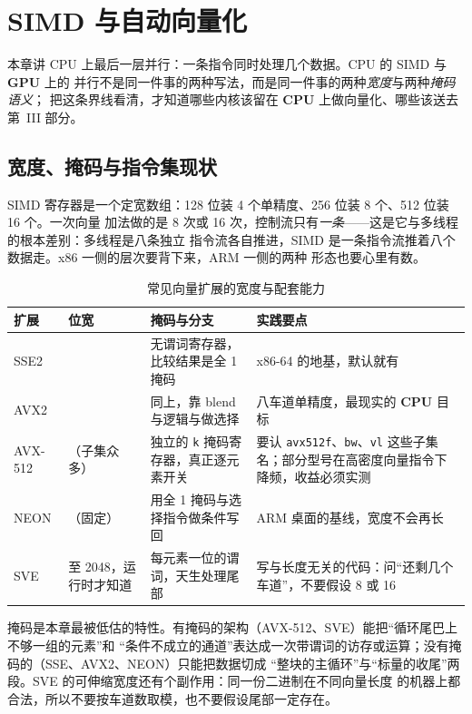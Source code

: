 \documentclass[12pt,a4paper,fontset=fandol]{ctexbook}
\newcommand{\Tp}[1]{\texttt{#1}}
\newcommand{\Dom}[1]{\textsf{\bfseries #1}}
\newcommand{\CPU}{\Dom{CPU}}
\newcommand{\GPU}{\Dom{GPU}}
\begin{document}
\chapter{SIMD 与自动向量化}

本章讲 CPU 上最后一层并行：一条指令同时处理几个数据。CPU 的 SIMD 与 \GPU{} 上的
并行不是同一件事的两种写法，而是同一件事的两种\emph{宽度}与两种\emph{掩码语义}；
把这条界线看清，才知道哪些内核该留在 \CPU{} 上做向量化、哪些该送去第~III 部分。

\section{宽度、掩码与指令集现状}

SIMD 寄存器是一个定宽数组：128 位装 4 个单精度、256 位装 8 个、512 位装 16 个。一次向量
加法做的是 8 次或 16 次，控制流只有\emph{一条}——这是它与多线程的根本差别：多线程是八条独立
指令流各自推进，SIMD 是一条指令流推着八个数据走。x86 一侧的层次要背下来，ARM 一侧的两种
形态也要心里有数。

\begin{table}[htbp]\centering
\caption{常见向量扩展的宽度与配套能力}
\begin{tabular}{@{}>{\raggedright\arraybackslash}p{}
  >{\raggedright\arraybackslash}p{}
  >{\raggedright\arraybackslash}p{}
  >{\raggedright\arraybackslash}p{}@{}}
\toprule
扩展 & 位宽 & 掩码与分支 & 实践要点 \\
\midrule
SSE2 & 128 & 无谓词寄存器，比较结果是全 1 掩码 & x86-64 的地基，默认就有 \\
AVX2 & 256 & 同上，靠 blend 与逻辑与做选择 & 八车道单精度，最现实的 \CPU{} 目标 \\
AVX-512 & 512（子集众多） & 独立的 \Tp{k} 掩码寄存器，真正逐元素开关 & 要认 \Tp{avx512f}、\Tp{bw}、\Tp{vl} 这些子集名；部分型号在高密度向量指令下降频，收益必须实测 \\
NEON & 128（固定） & 用全 1 掩码与选择指令做条件写回 & ARM 桌面的基线，宽度不会再长 \\
SVE & 128 至 2048，运行时才知道 & 每元素一位的谓词，天生处理尾部 & 写与长度无关的代码：问``还剩几个车道''，不要假设 8 或 16 \\
\bottomrule
\end{tabular}
\end{table}

掩码是本章最被低估的特性。有掩码的架构（AVX-512、SVE）能把``循环尾巴上不够一组的元素''和
``条件不成立的通道''表达成一次带谓词的访存或运算；没有掩码的（SSE、AVX2、NEON）只能把数据切成
``整块的主循环''与``标量的收尾''两段。SVE 的可伸缩宽度还有个副作用：同一份二进制在不同向量长度
的机器上都合法，所以不要按车道数取模，也不要假设尾部一定存在。
\end{document}

